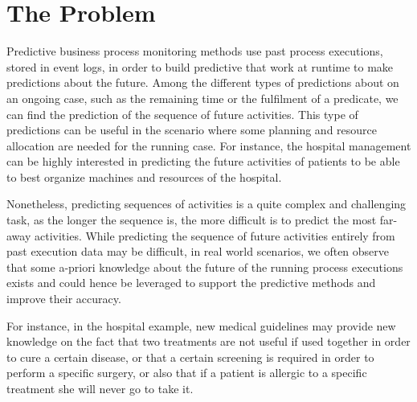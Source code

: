 
\section{The Problem} %
\label{sec:the_problem}
Predictive business process monitoring methods use past process executions, stored in event logs, in order to build predictive that work at runtime to make predictions about the future.
Among the different types of predictions about on an ongoing case, such as the remaining time or the fulfilment of a predicate, we can find the prediction of the sequence of future activities. This type of predictions can be useful in the scenario where some planning and resource allocation are needed for the running case.
For instance, the hospital management can be highly interested in predicting the future activities of patients to be able to best organize machines and resources of the hospital.



Nonetheless, predicting sequences of activities is a quite complex and challenging task, as the longer the sequence is, the more difficult is to predict the most far-away activities.
While predicting the sequence of future activities entirely from past execution data may be difficult, in real world scenarios, we often observe that some a-priori knowledge about the future of the running process executions exists and could hence be leveraged to support the predictive methods and improve their accuracy.


For instance, in the hospital example, new medical guidelines may provide new knowledge on the fact that two treatments are not useful if used together in order to cure a certain disease, or that a certain screening is required in order to perform a specific surgery, or also that if a patient is allergic to a specific treatment she will never go to take it.

